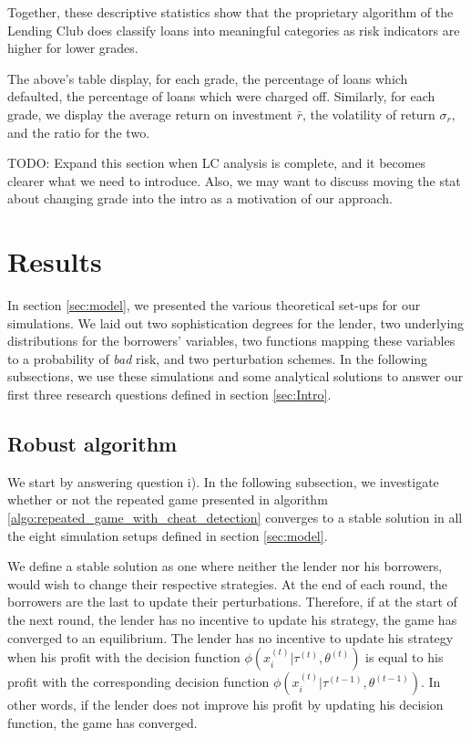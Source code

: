 \documentclass[12pt]{article} %
\begin{document}
Together, these descriptive statistics show that the proprietary algorithm of the Lending Club does classify loans into meaningful categories as risk indicators are higher for lower grades. 

\begin{table}[t!]
   \centering

   \caption{The above's table display, for each grade, the percentage of loans which defaulted, the percentage of loans which were charged off. Similarly, for each grade, we display the average return on investment $\bar{r}$, the volatility of return $\sigma_r$, and the ratio for the two. 
}
\label{table:gr_stats}
\end{table}

TODO: Expand this section when LC analysis is complete, and it becomes clearer what we need to introduce. Also, we may want to discuss moving the stat about changing grade into the intro as a motivation of our approach. 




\section{Results}
\label{sec:results}
In section \ref{sec:model}, we presented the various theoretical set-ups for our simulations. We laid out two sophistication degrees for the lender, two underlying distributions for the borrowers' variables, two functions mapping these variables to a probability of \textit{bad} risk, and two perturbation schemes. In the following subsections, we use these simulations and some analytical solutions to answer our first three research questions defined in section \ref{sec:Intro}. 
\subsection{Robust algorithm}
\label{sec:robust_algorithm}

We start by answering question i). In the following subsection, we investigate whether or not the repeated game presented in algorithm \eqref{algo:repeated_game_with_cheat_detection} converges to a stable solution in all the eight simulation setups defined in section \ref{sec:model}. 

We define a stable solution as one where neither the lender nor his borrowers, would wish to change their respective strategies. At the end of each round, the borrowers are the last to update their perturbations. Therefore, if at the start of the next round, the lender has no incentive to update his strategy, the game has converged to an equilibrium. 
The lender has no incentive to update his strategy when his profit with the decision function $\phi(x_i^{(t)}|\tau^{(t)},\theta^{(t)})$ is equal to his profit with the corresponding decision function $\phi(x_i^{(t)}|\tau^{(t-1)},\theta^{(t-1)})$. In other words, if the lender does not improve his profit by updating his decision function, the game has converged. 
\end{document}
